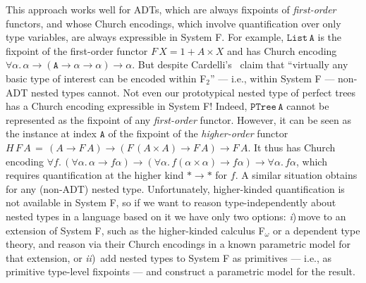 \documentclass{lmcs}
\theoremstyle{plain}\newtheorem{satz}[thm]{Satz}
\begin{document}
This approach works well for ADTs, which are always fixpoints of {\em
  first-order} functors, and whose Church encodings, which involve
quantification over only type variables, are always expressible in
System F. For example, $\mathtt{List\,A}$ is the fixpoint of the
first-order functor $F\,X = 1 + A \times X$ and has Church encoding
$\forall \alpha. \, \alpha \to (\mathtt{A} \to \alpha \to \alpha) \to
\alpha$. But despite Cardelli's~\cite{car97} claim that ``virtually
any basic type of interest can be encoded within F$_2$'' --- i.e.,
within System F --- non-ADT nested types cannot.  Not even our
prototypical nested type of perfect trees has a Church encoding
expressible in System F!  Indeed, $\mathtt{PTree\,A}$ cannot be
represented as the fixpoint of any {\em first-order} functor. However,
it can be seen as the instance at index $\mathtt{A}$ of the fixpoint
of the {\em higher-order} functor $H\,F\,A\,=\, (A \to F\,A) \to (F
\,(A \times A) \to F\,A) \to F\,A$. It thus has Church encoding
$\forall f.\, (\forall \alpha.\,\alpha \to f\alpha) \to (\forall
\alpha. \,f (\alpha \times \alpha) \to f\alpha) \to \forall \alpha.\,
f\alpha$, which requires quantification at the higher kind $* \to *$
for $f$. A similar situation obtains for any (non-ADT) nested
type. Unfortunately, higher-kinded quantification is not available in
System F, so if we want to reason type-independently about nested
types in a language based on it we have only two options: {\em
  i})\,move to an extension of System F, such as the higher-kinded
calculus F$_\omega$ or a dependent type theory, and reason via their
Church encodings in a known parametric model for that extension, or
{\em ii})\, add nested types to System F as primitives --- i.e., as
primitive type-level fixpoints --- and construct a parametric model
for the result.
\end{document}
